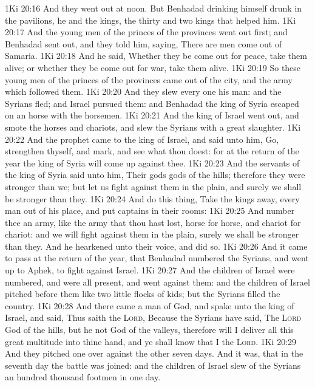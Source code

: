 \vs 1Ki 20:16 And they went out at noon. But Benhadad  drinking himself drunk in the pavilions, he and the kings, the thirty and two kings that helped him.
\vs 1Ki 20:17 And the young men of the princes of the provinces went out first; and Benhadad sent out, and they told him, saying, There are men come out of Samaria.
\vs 1Ki 20:18 And he said, Whether they be come out for peace, take them alive; or whether they be come out for war, take them alive.
\vs 1Ki 20:19 So these young men of the princes of the provinces came out of the city, and the army which followed them.
\vs 1Ki 20:20 And they slew every one his man: and the Syrians fled; and Israel pursued them: and Benhadad the king of Syria escaped on an horse with the horsemen.
\vs 1Ki 20:21 And the king of Israel went out, and smote the horses and chariots, and slew the Syrians with a great slaughter.
\vs 1Ki 20:22 And the prophet came to the king of Israel, and said unto him, Go, strengthen thyself, and mark, and see what thou doest: for at the return of the year the king of Syria will come up against thee.
\vs 1Ki 20:23 And the servants of the king of Syria said unto him, Their gods  gods of the hills; therefore they were stronger than we; but let us fight against them in the plain, and surely we shall be stronger than they.
\vs 1Ki 20:24 And do this thing, Take the kings away, every man out of his place, and put captains in their rooms:
\vs 1Ki 20:25 And number thee an army, like the army that thou hast lost, horse for horse, and chariot for chariot: and we will fight against them in the plain,  surely we shall be stronger than they. And he hearkened unto their voice, and did so.
\vs 1Ki 20:26 And it came to pass at the return of the year, that Benhadad numbered the Syrians, and went up to Aphek, to fight against Israel.
\vs 1Ki 20:27 And the children of Israel were numbered, and were all present, and went against them: and the children of Israel pitched before them like two little flocks of kids; but the Syrians filled the country.
\vs 1Ki 20:28 And there came a man of God, and spake unto the king of Israel, and said, Thus saith the \textsc{Lord}, Because the Syrians have said, The \textsc{Lord}  God of the hills, but he  not God of the valleys, therefore will I deliver all this great multitude into thine hand, and ye shall know that I  the \textsc{Lord}.
\vs 1Ki 20:29 And they pitched one over against the other seven days. And  it was, that in the seventh day the battle was joined: and the children of Israel slew of the Syrians an hundred thousand footmen in one day.
